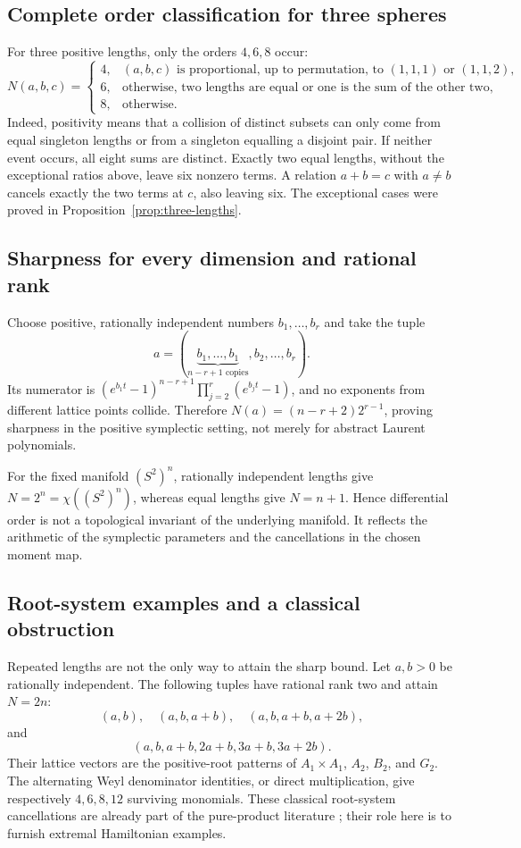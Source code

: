 \documentclass[11pt]{article}
\theoremstyle{definition}
\theoremstyle{remark}
\numberwithin{equation}{section}
\begin{document}
\subsection{Complete order classification for three spheres}
For three positive lengths, only the orders $4,6,8$ occur:
\begin{equation}\label{eq:three-full}
 N(a,b,c)=
 \begin{cases}
 4,&(a,b,c)\text{ is proportional, up to permutation, to }
                  (1,1,1)\text{ or }(1,1,2),\\
 6,&\text{otherwise, two lengths are equal or one is the sum of the other two},\\
 8,&\text{otherwise}.
 \end{cases}
\end{equation}
Indeed, positivity means that a collision of distinct subsets can only
come from equal singleton lengths or from a singleton equalling a
disjoint pair. If neither event occurs, all eight sums are distinct.
Exactly two equal lengths, without the exceptional ratios above, leave
six nonzero terms. A relation $a+b=c$ with $a\ne b$ cancels exactly
the two terms at $c$, also leaving six. The exceptional cases were
proved in Proposition~\ref{prop:three-lengths}.

\subsection{Sharpness for every dimension and rational rank}
Choose positive, rationally independent numbers $b_1,\ldots,b_r$ and
take the tuple
\[
 a=(\underbrace{b_1,\ldots,b_1}_{n-r+1\text{ copies}},b_2,\ldots,b_r).
\]
Its numerator is $(e^{b_1t}-1)^{n-r+1}\prod_{j=2}^r(e^{b_jt}-1)$,
and no exponents from different lattice points collide. Therefore
$N(a)=(n-r+2)2^{r-1}$, proving sharpness in the positive symplectic
setting, not merely for abstract Laurent polynomials.

For the fixed manifold $(S^2)^n$, rationally independent lengths give
$N=2^n=\chi((S^2)^n)$, whereas equal lengths give $N=n+1$.
Hence differential order is not a topological invariant of the
underlying manifold. It reflects the arithmetic of the symplectic
parameters and the cancellations in the chosen moment map.

\subsection{Root-system examples and a classical obstruction}
Repeated lengths are not the only way to attain the sharp bound.
Let $a,b>0$ be rationally independent. The following tuples have
rational rank two and attain $N=2n$:
\[
 (a,b),\quad (a,b,a+b),\quad (a,b,a+b,a+2b),
\]
and
\[
 (a,b,a+b,2a+b,3a+b,3a+2b).
\]
Their lattice vectors are the positive-root patterns of
$A_1\times A_1$, $A_2$, $B_2$, and $G_2$.
The alternating Weyl denominator identities, or direct multiplication,
give respectively $4,6,8,12$ surviving monomials. These classical
root-system cancellations are already part of the pure-product
literature \cite{MaltbyRoots}; their role here is to furnish extremal
Hamiltonian examples.
\end{document}
